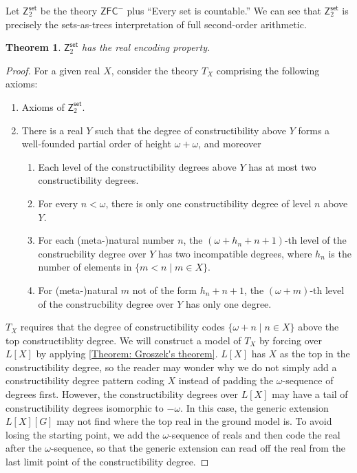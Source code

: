 \documentclass{amsart}
\newtheorem{theorem}{Theorem}[section]
\theoremstyle{remark}
\newcommand{\set}{\mathsf{set}}
\newcommand{\ZFC}{\mathsf{ZFC}}
\begin{document}
Let $\mathsf{Z}_2^\set$ be the theory $\ZFC^-$ plus ``Every set is countable.'' We can see that $\mathsf{Z}_2^\set$ is precisely the sets-as-trees interpretation of full second-order arithmetic.
\begin{theorem} \label{Theorem: Real encoding property of Z2}
    $\mathsf{Z}_2^\set$ has the real encoding property.
\end{theorem}
\begin{proof}
    For a given real $X$, consider the theory $T_X$ comprising the following axioms:
    \begin{enumerate}
        \item Axioms of $\mathsf{Z}_2^\set$.
        \item There is a real $Y$ such that the degree of constructibility above $Y$ forms a well-founded partial order of height $\omega+\omega$, and moreover
        \begin{enumerate}
            \item Each level of the constructibility degrees above $Y$ has at most two constructibility degrees.
            \item For every $n<\omega$, there is only one constructibility degree of level $n$ above $Y$.
            \item For each (meta-)natural number $n$, the $(\omega+h_n+n+1)$-th level of the construcbility degree over $Y$ has two incompatible degrees, where $h_n$ is the number of elements in $\{m<n\mid m\in X\}$.
            \item For (meta-)natural $m$ not of the form $h_n+n+1$, the $(\omega+m)$-th level of the construcbility degree over $Y$ has only one degree.
        \end{enumerate}
    \end{enumerate}
    $T_X$ requires that the degree of constructibility codes $\{\omega + n\mid n\in X\}$ above the top constructiblity degree. 
    We will construct a model of $T_X$ by forcing over $L[X]$ by applying \autoref{Theorem: Groszek's theorem}. $L[X]$ has $X$ as the top in the constructibility degree, so the reader may wonder why we do not simply add a constructibility degree pattern coding $X$ instead of padding the $\omega$-sequence of degrees first.
    However, the constructibility degrees over $L[X]$ may have a tail of constructibility degrees isomorphic to $-\omega$. In this case, the generic extension $L[X][G]$ may not find where the top real in the ground model is. To avoid losing the starting point, we add the $\omega$-sequence of reals and then code the real after the $\omega$-sequence, so that the generic extension can read off the real from the last limit point of the constructibility degree.


\end{proof}
\end{document}

